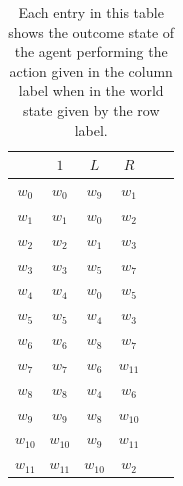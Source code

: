 \begin{table}[H]
    \centering
    \begin{tabular}{c|c c c c c}
                &  $1$      & $L$      & $R$\\
         \hline
        $w_{0}$ & $w_{0}$   & $w_{9}$   & $w_{1}$\\
        $w_{1}$ & $w_{1}$   & $w_{0}$   & $w_{2}$\\
        $w_{2}$ & $w_{2}$   & $w_{1}$   & $w_{3}$\\
        $w_{3}$ & $w_{3}$   & $w_{5}$   & $w_{7}$\\
        $w_{4}$ & $w_{4}$   & $w_{0}$   & $w_{5}$\\
        $w_{5}$ & $w_{5}$   & $w_{4}$   & $w_{3}$\\
        $w_{6}$ & $w_{6}$   & $w_{8}$   & $w_{7}$\\
        $w_{7}$ & $w_{7}$   & $w_{6}$   & $w_{11}$\\
        $w_{8}$ & $w_{8}$   & $w_{4}$   & $w_{6}$\\
        $w_{9}$ & $w_{9}$   & $w_{8}$   & $w_{10}$\\
        $w_{10}$ & $w_{10}$ & $w_{9}$   & $w_{11}$\\
        $w_{11}$ & $w_{11}$ & $w_{10}$  & $w_{2}$\\
    \end{tabular}
    \caption{
    Each entry in this table shows the outcome state of the agent performing the action given in the column label when in the world state given by the row label.
    }
    \label{tab:4x1_gridworld_min_transitions_moveable_block}
\end{table}

